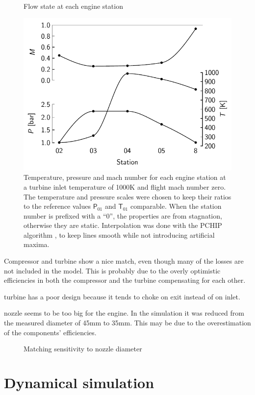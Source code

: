 \documentclass[tcc]{subfiles}
\begin{document}
\begin{figure}
    \centering
    \caption{Flow state at each engine station}
    \includegraphics{fig/stations1000K}
    \caption*{Temperature, pressure and mach number for each engine station at a turbine inlet temperature of 1000K and flight mach number zero. The temperature and pressure scales were chosen to keep their ratios to the reference values $\mathsf P_{01}$ and $\mathsf T_{01}$ comparable. When the station number is prefixed with a ``0'', the properties are from stagnation, otherwise they are static. Interpolation was done with the PCHIP algorithm \cite{Fritsch1980}, to keep lines smooth while not introducing artificial maxima.}
\end{figure}

Compressor and turbine show a nice match, even though many of the losses are not included in the model.
This is probably due to the overly optimistic efficiencies in both the compressor and the turbine compensating for each other.

turbine has a poor design because it tends to choke on exit instead of on inlet.

nozzle seems to be too big for the engine. In the simulation it was reduced from the measured diameter of 45mm to 35mm. This may be due to the overestimation of the components' efficiencies.


\begin{figure}
    \caption{Matching sensitivity to nozzle diameter}
\end{figure}

\section{Dynamical simulation}
\end{document}
